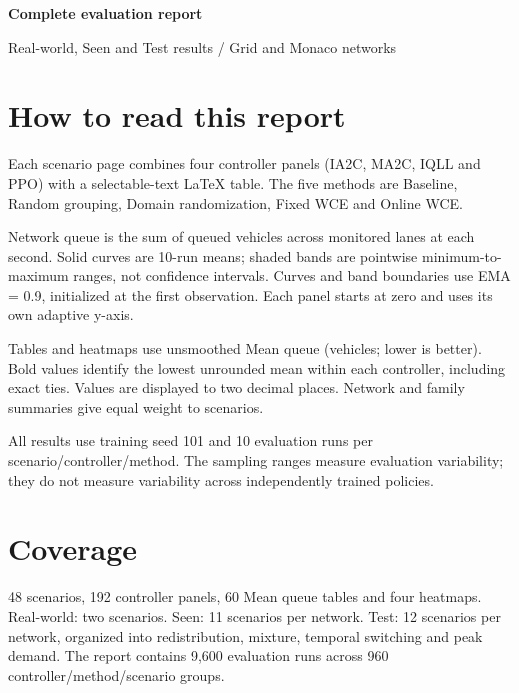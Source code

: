 \documentclass[11pt]{article}
\begin{document}
{\Huge\bfseries Complete evaluation report}\par\vspace{8mm}
{\Large Real-world, Seen and Test results / Grid and Monaco networks}\par\vspace{8mm}
\begin{minipage}[t]{0.57\textwidth}
\section*{How to read this report}
Each scenario page combines four controller panels (IA2C, MA2C, IQLL and PPO)
with a selectable-text LaTeX table. The five methods are Baseline, Random grouping,
Domain randomization, Fixed WCE and Online WCE.

Network queue is the sum of queued vehicles across monitored lanes at each second.
Solid curves are 10-run means; shaded bands are pointwise minimum-to-maximum ranges,
not confidence intervals. Curves and band boundaries use EMA = 0.9, initialized at
the first observation. Each panel starts at zero and uses its own adaptive y-axis.

Tables and heatmaps use unsmoothed Mean queue (vehicles; lower is better).
Bold values identify the lowest unrounded mean within each controller, including
exact ties. Values are displayed to two decimal places. Network and family summaries
give equal weight to scenarios.

All results use training seed 101 and 10 evaluation runs per scenario/controller/method.
The sampling ranges measure evaluation variability; they do not measure variability
across independently trained policies.

\section*{Coverage}
48 scenarios, 192 controller panels, 60 Mean queue tables and four heatmaps.
Real-world: two scenarios. Seen: 11 scenarios per network. Test: 12 scenarios per
network, organized into redistribution, mixture, temporal switching and peak demand.
The report contains 9,600 evaluation runs across 960 controller/method/scenario groups.
\end{minipage}\hfill
\end{document}
